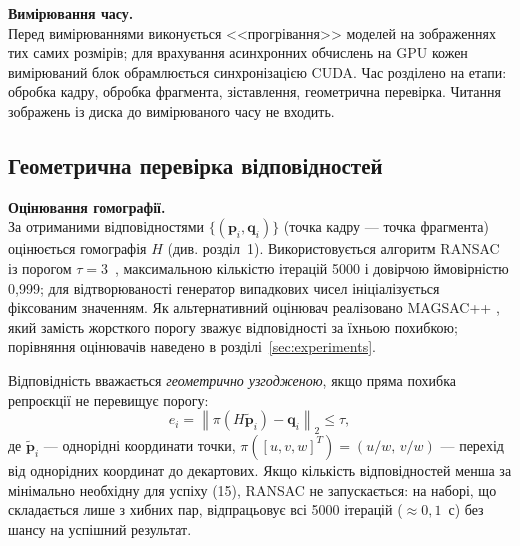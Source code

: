 \documentclass[a4paper, 12pt, titlepage]{article}
\begin{document}
\textbf{Вимірювання часу.}\\
Перед вимірюваннями виконується <<прогрівання>> моделей на зображеннях тих самих розмірів; для врахування асинхронних обчислень на GPU кожен вимірюваний блок обрамлюється синхронізацією CUDA. Час розділено на етапи: обробка кадру, обробка фрагмента, зіставлення, геометрична перевірка. Читання зображень із диска до вимірюваного часу не входить.

\subsection{Геометрична перевірка відповідностей}

\textbf{Оцінювання гомографії.}\\
За отриманими відповідностями $\{(\mathbf{p}_i, \mathbf{q}_i)\}$ (точка кадру --- точка фрагмента) оцінюється гомографія $H$ (див. розділ~1). Використовується алгоритм RANSAC \cite{ransac} із порогом $\tau = 3$~\px{}, максимальною кількістю ітерацій 5000 і довірчою ймовірністю 0,999; для відтворюваності генератор випадкових чисел ініціалізується фіксованим значенням. Як альтернативний оцінювач реалізовано MAGSAC++ \cite{magsac}, який замість жорсткого порогу зважує відповідності за їхньою похибкою; порівняння оцінювачів наведено в розділі~\ref{sec:experiments}.

Відповідність вважається \emph{геометрично узгодженою}, якщо пряма похибка репроєкції не перевищує порогу:
\begin{equation}
e_i = \left\| \pi(H \tilde{\mathbf{p}}_i) - \mathbf{q}_i \right\|_2 \le \tau,
\end{equation}
де $\tilde{\mathbf{p}}_i$ --- однорідні координати точки, $\pi([u, v, w]^T) = (u/w,\, v/w)$ --- перехід від однорідних координат до декартових. Якщо кількість відповідностей менша за мінімально необхідну для успіху (15), RANSAC не запускається: на наборі, що складається лише з хибних пар,  відпрацьовує всі 5000 ітерацій ($\approx 0{,}1$~с) без шансу на успішний результат.
\end{document}
